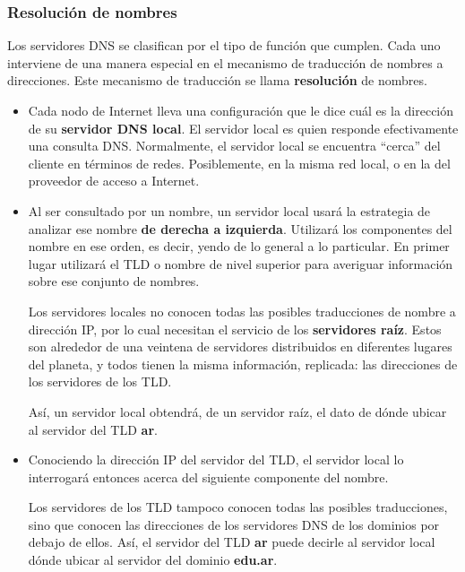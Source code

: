 \documentclass[spanish,a4paper,]{article}
\begin{document}
\hypertarget{resoluciuxf3n-de-nombres}{%
\subsubsection{Resolución de nombres}\label{resoluciuxf3n-de-nombres}}

Los servidores DNS se clasifican por el tipo de función que cumplen.
Cada uno interviene de una manera especial en el mecanismo de traducción
de nombres a direcciones. Este mecanismo de traducción se llama
\textbf{resolución} de nombres.

\begin{itemize}
\item
  Cada nodo de Internet lleva una configuración que le dice cuál es la
  dirección de su \textbf{servidor DNS local}. El servidor local es
  quien responde efectivamente una consulta DNS. Normalmente, el
  servidor local se encuentra ``cerca'' del cliente en términos de
  redes. Posiblemente, en la misma red local, o en la del proveedor de
  acceso a Internet.
\item
  Al ser consultado por un nombre, un servidor local usará la estrategia
  de analizar ese nombre \textbf{de derecha a izquierda}. Utilizará los
  componentes del nombre en ese orden, es decir, yendo de lo general a
  lo particular. En primer lugar utilizará el TLD o nombre de nivel
  superior para averiguar información sobre ese conjunto de nombres.

  Los servidores locales no conocen todas las posibles traducciones de
  nombre a dirección IP, por lo cual necesitan el servicio de los
  \textbf{servidores raíz}. Estos son alrededor de una veintena de
  servidores distribuidos en diferentes lugares del planeta, y todos
  tienen la misma información, replicada: las direcciones de los
  servidores de los TLD.

  Así, un servidor local obtendrá, de un servidor raíz, el dato de dónde
  ubicar al servidor del TLD \textbf{ar}.
\item
  Conociendo la dirección IP del servidor del TLD, el servidor local lo
  interrogará entonces acerca del siguiente componente del nombre.

  Los servidores de los TLD tampoco conocen todas las posibles
  traducciones, sino que conocen las direcciones de los servidores DNS
  de los dominios por debajo de ellos. Así, el servidor del TLD
  \textbf{ar} puede decirle al servidor local dónde ubicar al servidor
  del dominio \textbf{edu.ar}.


\end{itemize}
\end{document}

